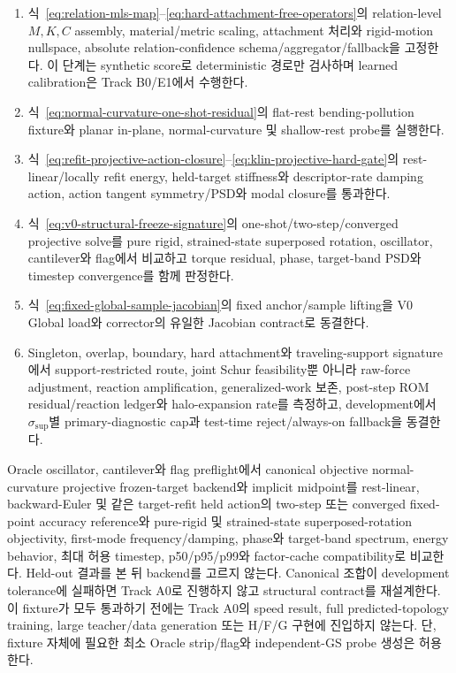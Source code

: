 \documentclass[11pt,a4paper]{article}
\begin{document}
\begin{enumerate}[leftmargin=1.7em]
  \item 식~\eqref{eq:relation-mls-map}--\eqref{eq:hard-attachment-free-operators}의
  relation-level \(M,K,C\) assembly, material/metric scaling, attachment 처리와
  rigid-motion nullspace, absolute relation-confidence schema/aggregator/fallback을 고정한다.
  이 단계는 synthetic score로 deterministic 경로만 검사하며 learned calibration은 Track B0/E1에서 수행한다.
  \item 식~\eqref{eq:normal-curvature-one-shot-residual}의 flat-rest bending-pollution fixture와
  planar in-plane, normal-curvature 및 shallow-rest probe를 실행한다.
  \item 식~\eqref{eq:refit-projective-action-closure}--\eqref{eq:klin-projective-hard-gate}의
  rest-linear/locally refit energy, held-target stiffness와 descriptor-rate damping action,
  action tangent symmetry/PSD와 modal closure를 통과한다.
  \item 식~\eqref{eq:v0-structural-freeze-signature}의 one-shot/two-step/converged projective solve를
  pure rigid, strained-state superposed rotation, oscillator, cantilever와 flag에서 비교하고
  torque residual, phase, target-band PSD와 timestep convergence를 함께 판정한다.
  \item 식~\eqref{eq:fixed-global-sample-jacobian}의 fixed anchor/sample lifting을
  V0 Global load와 corrector의 유일한 Jacobian contract로 동결한다.
  \item Singleton, overlap, boundary, hard attachment와 traveling-support signature에서
  support-restricted route, joint Schur feasibility뿐 아니라 raw-force adjustment,
  reaction amplification, generalized-work 보존, post-step ROM residual/reaction ledger와
  halo-expansion rate를 측정하고, development에서 \(\sigma_{\mathrm{sup}}\)별 primary-diagnostic
  cap과 test-time reject/always-on fallback을 동결한다.
\end{enumerate}

Oracle oscillator, cantilever와 flag preflight에서 canonical objective normal-curvature projective
frozen-target backend와 implicit midpoint를 rest-linear, backward-Euler 및
같은 target-refit held action의 two-step 또는 converged fixed-point accuracy reference와
pure-rigid 및 strained-state superposed-rotation objectivity,
first-mode frequency/damping, phase와 target-band spectrum, energy behavior,
최대 허용 timestep, p50/p95/p99와 factor-cache compatibility로 비교한다.
Held-out 결과를 본 뒤 backend를 고르지 않는다. Canonical 조합이 development tolerance에 실패하면
Track A0로 진행하지 않고 structural contract를 재설계한다.
이 fixture가 모두 통과하기 전에는 Track A0의 speed result, full predicted-topology training,
large teacher/data generation 또는 H/F/G 구현에 진입하지 않는다.
단, fixture 자체에 필요한 최소 Oracle strip/flag와 independent-GS probe 생성은 허용한다.
\end{document}
